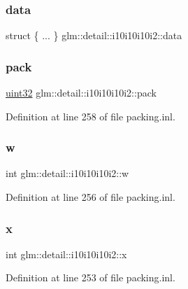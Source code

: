 \subsubsection{\texorpdfstring{data}{data}}
{\footnotesize\ttfamily struct \{ ... \}   glm\+::detail\+::i10i10i10i2\+::data}

\mbox{\label{unionglm_1_1detail_1_1i10i10i10i2_a24e2dc324c86589d568dc330904c859a}} 
\subsubsection{\texorpdfstring{pack}{pack}}
{\footnotesize\ttfamily \mbox{\hyperlink{namespaceglm_1_1detail_ade6cfbf377022aaa391af8cd50489222}{uint32}} glm\+::detail\+::i10i10i10i2\+::pack}



Definition at line 258 of file packing.\+inl.

\mbox{\label{unionglm_1_1detail_1_1i10i10i10i2_a20c12acbdb874a476b158164acd17abd}} 
\subsubsection{\texorpdfstring{w}{w}}
{\footnotesize\ttfamily int glm\+::detail\+::i10i10i10i2\+::w}



Definition at line 256 of file packing.\+inl.

\mbox{\label{unionglm_1_1detail_1_1i10i10i10i2_a290d519ee2feaba6ae4b5244d5d90e7b}} 
\subsubsection{\texorpdfstring{x}{x}}
{\footnotesize\ttfamily int glm\+::detail\+::i10i10i10i2\+::x}



Definition at line 253 of file packing.\+inl.


